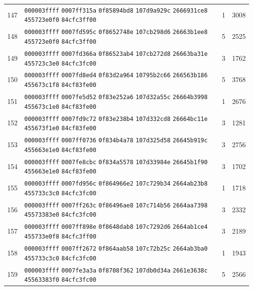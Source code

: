 \begin{longtable}{@{}r p{12cm} r r@{}}
147 & \texttt{000003ffff} \texttt{0007ff315a} \texttt{0f85894bd8} \texttt{107d9a929c} \texttt{2666931ce8} \texttt{455723e0f0} \texttt{84cfc3ff00} & 1 & 3008 \\
148 & \texttt{000003ffff} \texttt{0007fd595c} \texttt{0f8652748e} \texttt{107cb298d6} \texttt{26663b1ee8} \texttt{455723e0f0} \texttt{84cfc3ff00} & 5 & 2525 \\
149 & \texttt{000003ffff} \texttt{0007fd366a} \texttt{0f86523ab4} \texttt{107cb272d8} \texttt{26663ba31e} \texttt{455723c3e0} \texttt{84cfc3fc00} & 3 & 1762 \\
150 & \texttt{000003ffff} \texttt{0007fd8ed4} \texttt{0f83d2a964} \texttt{10795b2c66} \texttt{266563b186} \texttt{455673c1f8} \texttt{84cf83fe00} & 5 & 3768 \\
151 & \texttt{000003ffff} \texttt{0007fe5d52} \texttt{0f83e252a6} \texttt{107d32a55c} \texttt{26664b3998} \texttt{455673c1e0} \texttt{84cf83fe00} & 1 & 2676 \\
152 & \texttt{000003ffff} \texttt{0007fd9c72} \texttt{0f83e238b4} \texttt{107d332cd8} \texttt{26664bc11e} \texttt{455673f1e0} \texttt{84cf83fe00} & 3 & 1281 \\
153 & \texttt{000003ffff} \texttt{0007ff0736} \texttt{0f834b4a78} \texttt{107d325d58} \texttt{26645b919c} \texttt{455663e1e0} \texttt{84cf83fe00} & 3 & 2756 \\
154 & \texttt{000003ffff} \texttt{0007fe8cbc} \texttt{0f834a5578} \texttt{107d33984e} \texttt{26645b1f90} \texttt{455663e1e0} \texttt{84cf83fe00} & 3 & 1702 \\
155 & \texttt{000003ffff} \texttt{0007fd956c} \texttt{0f864966e2} \texttt{107c729b34} \texttt{2664ab23b8} \texttt{455733c3c0} \texttt{84cfc3fc00} & 1 & 1718 \\
156 & \texttt{000003ffff} \texttt{0007ff263c} \texttt{0f86496ae8} \texttt{107c714b56} \texttt{2664aa7398} \texttt{45573383e0} \texttt{84cfc3fc00} & 3 & 2332 \\
157 & \texttt{000003ffff} \texttt{0007ff898e} \texttt{0f8648dab8} \texttt{107c7292d6} \texttt{2664ab1ce4} \texttt{455733e0f8} \texttt{84cfc3ff00} & 3 & 2189 \\
158 & \texttt{000003ffff} \texttt{0007ff2672} \texttt{0f864aab58} \texttt{107c72b25c} \texttt{2664ab3ba0} \texttt{455733c3c0} \texttt{84cfc3fc00} & 1 & 1943 \\
159 & \texttt{000003ffff} \texttt{0007fe3a3a} \texttt{0f8708f362} \texttt{107db0d34a} \texttt{2661e3638c} \texttt{45563383f0} \texttt{84cfc3fc00} & 5 & 2566 \\

\end{longtable}
